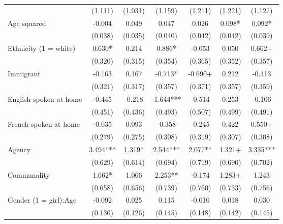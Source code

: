 \documentclass[
  letterpaper,
  DIV=11,
  numbers=noendperiod]{scrreprt}
\begin{document}
\begin{table}
\begin{tabular}[t]{lcccccc}
\hspace{1em} & (1.111) & (1.031) & (1.159) & (1.211) & (1.221) & (1.127)\\
\hspace{1em}Age squared & -0.004 & 0.049 & 0.047 & 0.026 & 0.098* & 0.092*\\
\hspace{1em} & (0.038) & (0.035) & (0.040) & (0.042) & (0.042) & (0.039)\\
\hspace{1em}Ethnicity (1 = white) & 0.630* & 0.214 & 0.886* & -0.053 & 0.050 & 0.662+\\
\hspace{1em} & (0.320) & (0.315) & (0.354) & (0.365) & (0.352) & (0.357)\\
\hspace{1em}Immigrant & -0.163 & 0.167 & -0.713* & -0.690+ & 0.212 & -0.413\\
\hspace{1em} & (0.321) & (0.317) & (0.357) & (0.371) & (0.357) & (0.359)\\
\hspace{1em}English spoken at home & -0.445 & -0.218 & -1.644*** & -0.514 & 0.253 & -0.106\\
\hspace{1em} & (0.451) & (0.436) & (0.493) & (0.507) & (0.499) & (0.491)\\
\hspace{1em}French spoken at home & -0.035 & 0.093 & -0.358 & -0.245 & 0.422 & 0.550+\\
\hspace{1em} & (0.279) & (0.275) & (0.308) & (0.319) & (0.307) & (0.308)\\
\hspace{1em}Agency & 3.494*** & 1.319* & 2.544*** & 2.077** & 1.321+ & 3.335***\\
\hspace{1em} & (0.629) & (0.614) & (0.694) & (0.719) & (0.690) & (0.702)\\
\hspace{1em}Communality & 1.662* & 1.066 & 2.253** & -0.174 & 1.283+ & 1.243\\
\hspace{1em} & (0.658) & (0.656) & (0.739) & (0.760) & (0.733) & (0.756)\\
\hspace{1em}Gender (1 = girl):Age & -0.092 & 0.025 & 0.115 & -0.010 & 0.018 & 0.030\\
\hspace{1em} & (0.130) & (0.126) & (0.145) & (0.148) & (0.142) & (0.145)\\

\end{tabular}
\end{table}
\end{document}
